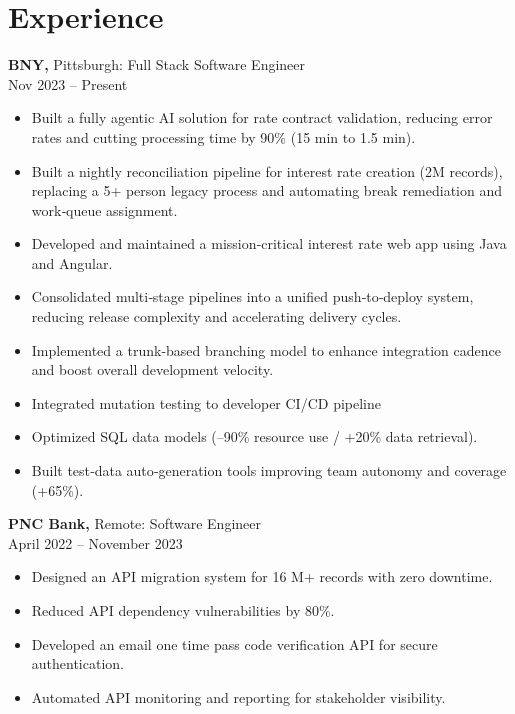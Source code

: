 \documentclass[10pt,a4paper]{article}
\begin{document}
\noindent
\begin{minipage}[t]{0.68\textwidth}

\section*{Experience}
\vspace{0.15cm}
\textbf{BNY,} Pittsburgh: Full Stack Software Engineer \\
Nov 2023 – Present
\vspace{0.15cm}
\begin{itemize}[leftmargin=*, nosep]
  \item Built a fully agentic AI solution for rate contract validation, reducing error rates and cutting processing time by 90\% (15 min to 1.5 min).
  \item Built a nightly reconciliation pipeline for interest rate creation (2M records), replacing a 5+ person legacy process and automating break remediation and work‑queue assignment.
  \item Developed and maintained a mission‑critical interest rate web app using Java and Angular.
  \item Consolidated multi‑stage pipelines into a unified push‑to‑deploy system, reducing release complexity and accelerating delivery cycles.
  \item Implemented a trunk‑based branching model to enhance integration cadence and boost overall development velocity.
  \item Integrated mutation testing to developer CI/CD pipeline
  \item Optimized SQL data models (–90\% resource use / +20\% data retrieval).
  \item Built test‑data auto‑generation tools improving team autonomy and coverage (+65\%).
\end{itemize}
\vspace{0.25cm}

\textbf{PNC Bank,} Remote: Software Engineer\\
April 2022 – November 2023
\vspace{0.15cm}
\begin{itemize}[leftmargin=*, nosep]
  \item Designed an API migration system for 16 M+ records with zero downtime.
  \item Reduced API dependency vulnerabilities by 80\%.
  \item Developed an email one time pass code verification API for secure authentication.
  \item Automated API monitoring and reporting for stakeholder visibility.
\end{itemize}


\end{minipage}
\end{document}

